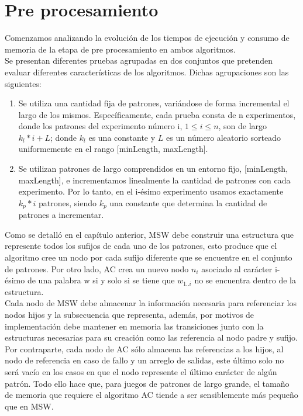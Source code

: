 {\section{Pre procesamiento}
\label{sec:pre_procesamiento}
Comenzamos analizando la evolución de los tiempos de ejecución y consumo de memoria de la etapa de pre procesamiento en ambos algoritmos.\\
Se presentan diferentes pruebas agrupadas en dos conjuntos que pretenden evaluar diferentes características de los algoritmos. Dichas agrupaciones son las siguientes:
\begin{enumerate}
\item Se utiliza una cantidad fija de patrones, variándose de forma incremental el largo de los mismos. Específicamente, cada prueba consta de n experimentos, donde los patrones del experimento número i, $1\le i\le n$, son de largo $k_{l} * i + L$; donde $k_{l}$ es una constante y $L$ es un número aleatorio sorteado uniformemente en el rango  [minLength, maxLength].
\item Se utilizan patrones de largo comprendidos en un entorno fijo, [minLength, maxLength], e incrementamos linealmente la cantidad de patrones con cada experimento. Por lo tanto, en el i-ésimo experimento usamos exactamente $k_{p} * i$ patrones, siendo $k_{p}$ una constante que determina la cantidad de patrones a incrementar.
\end{enumerate}
Como se detalló en el capítulo anterior, MSW debe construir una estructura que represente todos los sufijos de cada uno de los patrones, esto produce que el algoritmo cree un nodo por cada sufijo diferente que se encuentre en el conjunto de patrones. Por otro lado, AC crea un nuevo nodo $n_{i}$ asociado al carácter i-ésimo  de una palabra w si y solo si se tiene que $w_{1..i}$  no se encuentra dentro de la estructura.\\
Cada nodo de MSW debe almacenar la información necesaria para referenciar los nodos hijos y la subsecuencia que representa, además, por motivos de implementación debe mantener en memoria las transiciones junto con la estructuras necesarias para su creación como las referencia al nodo padre y sufijo.\\
Por contraparte, cada nodo de AC sólo almacena las referencias a los hijos, al nodo de referencia en caso de fallo y un arreglo de salidas, este último solo no será vacío en los casos en que el nodo represente el último carácter de algún patrón. Todo ello hace que, para juegos de patrones de largo grande, el tamaño de memoria que requiere el algoritmo AC tiende a ser sensiblemente más pequeño que en MSW. 
}
